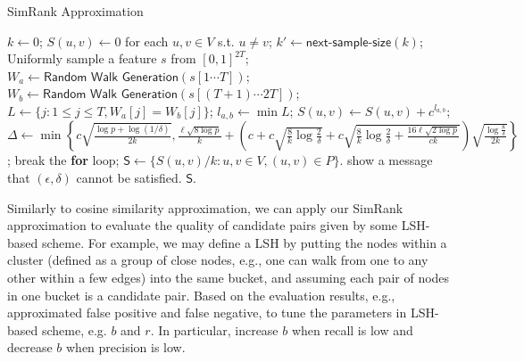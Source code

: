 \documentclass{article}
\begin{document}
\begin{algorithm}[!t]
\caption{\textsf{SimRank Approximation}}
\label{alg:sra}
\renewcommand{\algorithmicrequire}{\textbf{Input:}}
\renewcommand{\algorithmicensure}{\textbf{Output:}}
\begin{algorithmic}
\State $k \gets 0$;
\State $S(u,v) \gets 0$ for each $u, v \in V$ s.t. $u\not= v$;
	\State $k' \gets \textsf{next-sample-size}(k)$;
		\State Uniformly sample a feature $s$ from $[0,1]^{2T}$;
			\State $W_a \gets \textsf{Random Walk Generation}(s[1\cdots T])$;
			\State $W_b \gets \textsf{Random Walk Generation}(s[(T+1)\cdots 2T])$;
			\State $L \gets \{j: 1\leq j\leq T, W_a[j] = W_b[j]\}$;
				\State $l_{a,b} \gets \min L$;
				\State $S(u,v) \gets S(u,v)+c^{l_{a,b}}$;
			\EndIf
		\EndFor
	\EndFor
	\State $\Delta \gets \min\left\{c\sqrt{\frac{\log p + \log(1/\delta)}{2k}}, \frac{\ell\sqrt{8\log p}}{k} +\left(c+c\sqrt{\frac{8}{k}\log \frac{2}{\delta}} + c\sqrt{\frac{8}{k}\log \frac{2}{\delta} + \frac{16\ell\sqrt{2\log p}}{ck}}\right)\sqrt{\frac{\log \frac{8}{\delta}}{2k}}\right\}$;
	\If {$\Delta \leq \epsilon$}
		\State break the {\bf for} loop;
	\EndIf
\EndFor
\State $\mathsf{S} \gets \{S(u,v)/k : u,v\in V, (u,v)\in P\}$.
	\State show a message that $(\epsilon,\delta)$ cannot be satisfied.
\EndIf
{} $\mathsf{S}$.
\end{algorithmic}
\end{algorithm}

{\color{black}
Similarly to cosine similarity approximation, we can apply our SimRank approximation to evaluate the quality of candidate pairs given by some LSH-based scheme. For example, we may define a LSH by putting the nodes within a cluster (defined as a group of close nodes, e.g., one can walk from one to any other within a few edges) into the same bucket, and assuming each pair of nodes in one bucket is a candidate pair. Based on the evaluation results, e.g., approximated false positive and false negative, to tune the parameters in LSH-based scheme, e.g. $b$ and $r$. In particular, increase $b$ when recall is low and decrease $b$ when precision is low.
}
\end{document}
